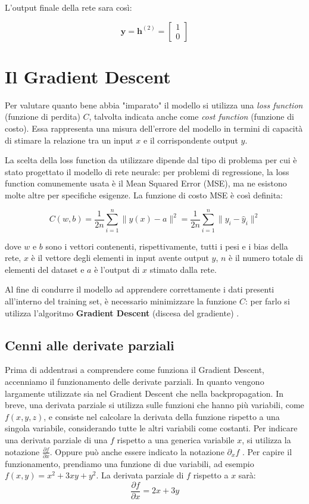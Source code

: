 L'output finale della rete sara così:

\[
{\mathbf{y}} = \mathbf{h}^{(2)}= \begin{bmatrix} 1 \\ 0 \end{bmatrix}
\]


\section{Il Gradient Descent}

Per valutare quanto bene abbia "imparato" il modello si utilizza una 
\textit{loss function} (funzione di perdita) \( C \), talvolta indicata anche come 
\textit{cost function} (funzione di costo). 
Essa rappresenta una misura dell’errore del modello in termini di capacità di 
stimare la relazione tra un input \( x \) e il corrispondente output \( y \).

La scelta della loss function da utilizzare dipende dal tipo di problema per 
cui è stato progettato il modello di rete neurale: per problemi di regressione, 
la loss function comunemente usata è il Mean Squared Error (MSE), ma ne esistono molte altre per specifiche
esigenze. La funzione di costo MSE è così definita:

\[
C(w, b) = \frac{1}{2n} \sum_{i=1}^n \|y(x) - a\|^2 = \frac{1}{2n} \sum_{i=1}^{n} \|y_i - \hat{y}_i\|^2
\]

dove \( w \) e \( b \) sono i vettori contenenti, rispettivamente, tutti i pesi e 
i bias della rete, \( x \) è il vettore degli elementi in input avente 
output \( y \), \( n \) è il numero totale di elementi del dataset e \( a \) è 
l’output di \( x \) stimato dalla rete.

Al fine di condurre il modello ad apprendere correttamente i dati presenti 
all’interno del training set, è necessario minimizzare la funzione \( C \): per 
farlo si utilizza l’algoritmo \textbf{Gradient Descent} (discesa del gradiente) 
\cite{GradientDescent_NeuralNetworks,GradientDescent_TowardsDataScience,GradientDescent_Medium}. 

\subsection{Cenni alle derivate parziali}
Prima di addentrasi a comprendere come funziona il Gradient Descent, accenniamo il 
funzionamento delle derivate parziali. In quanto vengono largamente 
utilizzate sia nel Gradient Descent che nella backpropagation.
In breve, una derivata parziale si utilizza sulle funzioni che hanno più variabili, 
come $f(x,y,z)$, e consiste nel calcolare la derivata della funzione rispetto a una 
singola variabile, considerando tutte le altri variabili come costanti.
Per indicare una derivata parziale di una $f$ rispetto a una generica variabile $x$, 
si utilizza la notazione $\frac{\partial f}{\partial x}$. 
Oppure può anche essere indicato la notazione $\partial_xf$ \cite{Derivate_parziali}.
Per capire il funzionamento, prendiamo una funzione di due variabili, ad 
esempio $f(x, y) = x^2 + 3xy + y^2$. 
La derivata parziale di $f$ rispetto a $x$ sarà: 
\[\frac{\partial f}{\partial x} = 2x + 3y\] 

